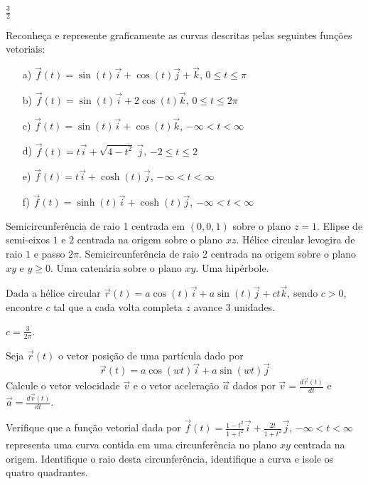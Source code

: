 \begin{resp}
 $\frac{3}{2}$
\end{resp}
\begin{exer} Reconheça e represente graficamente as curvas descritas pelas seguintes funções vetoriais:
\begin{itemize}
\item [a)] $\vec{f}(t)=\sin(t)\vec{i}+\cos(t)\vec{j}+\vec{k}$, $0\leq t \leq \pi$
\item [b)] $\vec{f}(t)=\sin(t)\vec{i}+2\cos(t)\vec{k}$, $0\leq t \leq 2\pi$
\item [c)] $\vec{f}(t)=\sin(t)\vec{i}+\cos(t)\vec{k}$, $-\infty < t < \infty$
\item [d)] $\vec{f}(t)=t\vec{i}+\sqrt{4-t^2}~\!\vec{j}$, $-2 \leq t \leq 2$
\item [e)] $\vec{f}(t)=t\vec{i}+\cosh(t)\vec{j}$, $-\infty < t < \infty $
\item [f)] $\vec{f}(t)=\sinh(t)\vec{i}+\cosh(t)\vec{j}$, $-\infty < t< \infty $
\end{itemize} 
\end{exer}
\begin{resp} Semicircunferência de raio 1 centrada em $(0,0,1)$ sobre o plano $z=1$. Elipse de semi-eixos $1$ e $2$ centrada na origem sobre o plano $xz$. Hélice circular levogira de raio $1$ e passo $2\pi$.  Semicircunferência de raio 2 centrada na origem sobre o plano $xy$ e $y\geq 0$. Uma catenária sobre o plano $xy$. Uma hipérbole. 
\end{resp}
\begin{exer}Dada a hélice circular $\vec{r}(t)=a\cos(t)\vec{i}+a\sin(t)\vec{j}+ct\vec{k}$, sendo $c>0$, encontre $c$ tal que a cada volta completa $z$ avance $3$ unidades.
 \end{exer}
 \begin{resp} $c=\frac{3}{2\pi}$.
 \end{resp}
\begin{exer}Seja $\vec{r}(t)$ o vetor posição de uma partícula dado por
$$\vec{r}(t)=a\cos(wt)\vec{i}+a\sin(wt)\vec{j}$$
Calcule o vetor velocidade $\vec{v}$ e o vetor aceleração $\vec{a}$ dados por $\vec{v}=\frac{d\vec{r}(t)}{dt}$ e $\vec{a}=\frac{d\vec{v}(t)}{dt}$.
\end{exer}



\begin{exer} Verifique que a função vetorial dada por $\vec{f}(t)=\frac{1-t^2}{1+t^2}\vec{i}+\frac{2t}{1+t^2}\vec{j}$, $-\infty<t<\infty$
representa uma curva contida em uma circunferência no plano $xy$  centrada na origem. Identifique o raio desta circunferência, identifique a curva e isole os quatro quadrantes.
\end{exer}

